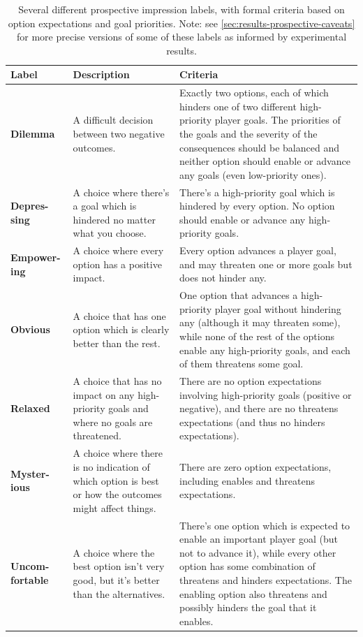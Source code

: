\begin{table}[!p]
\begingroup
\renewcommand*{\arraystretch}{1.5}
\begin{tabular}{p{4.5em}p{10em}p{18.5em}}
\textbf{Label} & \textbf{Description} & \textbf{Criteria} \\
\hline
\textbf{Dilemma} & A difficult decision between two negative outcomes. & Exactly two options, each of which hinders one of two different high-priority player goals. The priorities of the goals and the severity of the consequences should be balanced and neither option should enable or advance any goals (even low-priority ones). \\
\textbf{Depres-sing} & A choice where there's a goal which is hindered no matter what you choose. & There's a high-priority goal which is hindered by every option. No option should enable or advance any high-priority goals. \\
\textbf{Empower-ing} & A choice where every option has a positive impact. & Every option advances a player goal, and may threaten one or more goals but does not hinder any. \\
\textbf{Obvious} & A choice that has one option which is clearly better than the rest. & One option that advances a high-priority player goal without hindering any (although it may threaten some), while none of the rest of the options enable any high-priority goals, and each of them threatens some goal. \\
\textbf{Relaxed} & A choice that has no impact on any high-priority goals and where no goals are threatened. & There are no option expectations involving high-priority goals (positive or negative), and there are no threatens expectations (and thus no hinders expectations). \\
\textbf{Myster-ious} & A choice where there is no indication of which option is best or how the outcomes might affect things. & There are zero option expectations, including enables and threatens expectations. \\
\textbf{Uncom-fortable} & A choice where the best option isn't very good, but it's better than the alternatives. & There's one option which is expected to enable an important player goal (but not to advance it), while every other option has some combination of threatens and hinders expectations. The enabling option also threatens and possibly hinders the goal that it enables. \\
\end{tabular}
\endgroup
\caption[Prospective choice impressions]{Several different prospective impression labels, with formal criteria based on option expectations and goal priorities. Note: see \cref{sec:results-prospective-caveats} for more precise versions of some of these labels as informed by experimental results.}
\label{tab:prospective-impressions}
\end{table}


